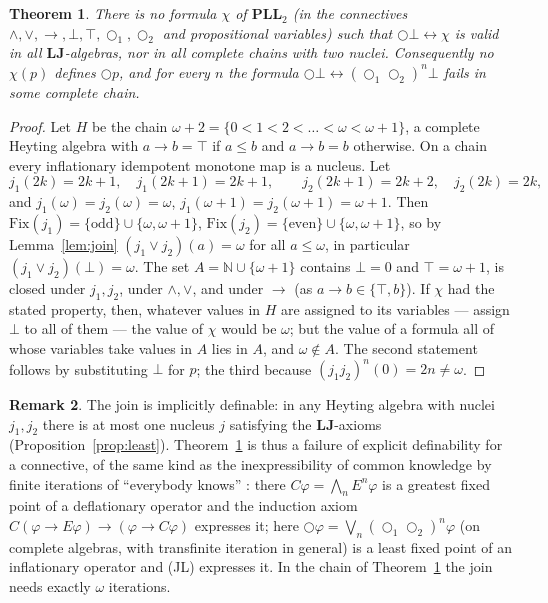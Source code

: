 \documentclass[11pt]{amsart}
\newtheorem{thm}{Theorem}[section]
\theoremstyle{definition}
\newtheorem{rem}[thm]{Remark}
\newcommand{\Fix}{\mathrm{Fix}}
\newcommand{\LLJ}{\mathbf{LJ}}
\newcommand{\PLLt}{\mathbf{PLL}_2}
\newcommand{\lax}{\bigcirc}
\newcommand{\laxa}{\bigcirc_1}
\newcommand{\laxb}{\bigcirc_2}
\begin{document}
\begin{thm}\label{thm:inexp}
There is no formula $\chi$ of $\PLLt$ (in the connectives $\wedge,\vee,\to,
\bot,\top,\laxa,\laxb$ and propositional variables) such that
$\lax\bot\leftrightarrow\chi$ is valid in all $\LLJ$-algebras, nor in all
complete chains with two nuclei. Consequently no $\chi(p)$ defines $\lax p$,
and for every $n$ the formula $\lax\bot\leftrightarrow(\laxa\laxb)^n\bot$ fails
in some complete chain.
\end{thm}
\begin{proof}
Let $H$ be the chain $\omega+2=\{0<1<2<\dots<\omega<\omega+1\}$, a complete
Heyting algebra with $a\to b=\top$ if $a\le b$ and $a\to b=b$ otherwise. On a
chain every inflationary idempotent monotone map is a nucleus. Let
\[
j_1(2k)=2k+1,\quad j_1(2k+1)=2k+1,\qquad j_2(2k+1)=2k+2,\quad j_2(2k)=2k,
\]
and $j_1(\omega)=j_2(\omega)=\omega$, $j_1(\omega+1)=j_2(\omega+1)=\omega+1$.
Then $\Fix(j_1)=\{\text{odd}\}\cup\{\omega,\omega+1\}$,
$\Fix(j_2)=\{\text{even}\}\cup\{\omega,\omega+1\}$, so by Lemma~\ref{lem:join}
$(j_1\vee j_2)(a)=\omega$ for all $a\le\omega$, in particular
$(j_1\vee j_2)(\bot)=\omega$. The set $A=\mathbb N\cup\{\omega+1\}$ contains
$\bot=0$ and $\top=\omega+1$, is closed under $j_1,j_2$, under $\wedge,\vee$,
and under $\to$ (as $a\to b\in\{\top,b\}$). If $\chi$ had the stated property,
then, whatever values in $H$ are assigned to its variables --- assign $\bot$ to
all of them --- the value of $\chi$ would be $\omega$; but the value of a
formula all of whose variables take values in $A$ lies in $A$, and
$\omega\notin A$. The second statement follows by substituting $\bot$ for $p$;
the third because $(j_1j_2)^n(0)=2n\ne\omega$.
\end{proof}

\begin{rem}
The join is implicitly definable: in any Heyting algebra with nuclei $j_1,j_2$
there is at most one nucleus $j$ satisfying the $\LLJ$-axioms
(Proposition~\ref{prop:least}). Theorem~\ref{thm:inexp} is thus a failure of
explicit definability for a connective, of the same kind as the
inexpressibility of common knowledge by finite iterations of ``everybody
knows'' \cite{HM}: there $C\varphi=\bigwedge_nE^n\varphi$ is a greatest fixed
point of a deflationary operator and the induction axiom
$C(\varphi\to E\varphi)\to(\varphi\to C\varphi)$ expresses it; here
$\lax\varphi=\bigvee_n(\laxa\laxb)^n\varphi$ (on complete algebras, with
transfinite iteration in general) is a least fixed point of an inflationary
operator and (JL) expresses it. In the chain of Theorem~\ref{thm:inexp} the
join needs exactly $\omega$ iterations.
\end{rem}
\end{document}

